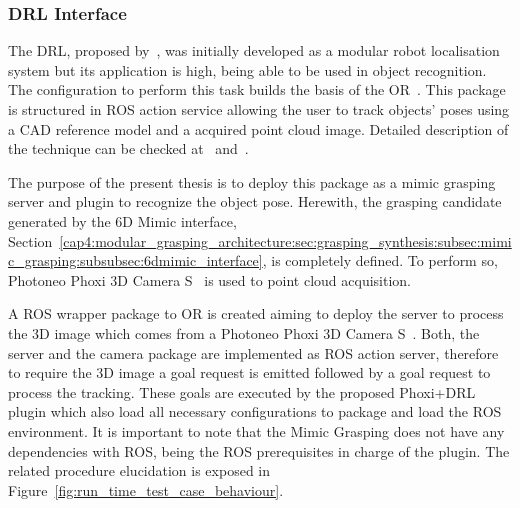 \subsubsection{\acl{DRL} Interface}
\label{cap4:modular_grasping_architecture:sec:grasping_synthesis:subsec:mimic_grasping:subsubsec:drl_interface}

The \ac{DRL}, proposed by~\cite{COSTA2016113}, was initially developed as a modular robot localisation system but its application is high, being able to be used in object recognition. The configuration to perform this task builds the basis of the \ac{OR}~\cite{or}. This package is structured in \ac{ROS} action service allowing the user to track objects' poses using a CAD reference model and a acquired point cloud image. Detailed description of the technique can be checked at~\cite{COSTA2016113} and~\cite{or}.

The purpose of the present thesis is to deploy this package as a mimic grasping server and plugin to recognize the object pose. Herewith, the grasping candidate generated by the 6D Mimic interface, Section~\ref{cap4:modular_grasping_architecture:sec:grasping_synthesis:subsec:mimic_grasping:subsubsec:6dmimic_interface}, is completely defined. To perform so, Photoneo Phoxi 3D Camera S~\cite{photoneo} is used to point cloud acquisition.


A \ac{ROS} wrapper package to \ac{OR} is created aiming to deploy the server to process the 3D image which comes from a Photoneo Phoxi 3D Camera S~\cite{photoneo}. Both, the server and the camera package are implemented as \ac{ROS} action server, therefore to require the 3D image a goal request is emitted followed by a goal request to process the tracking. These goals are executed by the proposed Phoxi+\ac{DRL} plugin which also load all necessary configurations to package and load the \ac{ROS} environment. It is important to note that the Mimic Grasping does not have any dependencies with ROS, being the \ac{ROS} prerequisites in charge of the plugin. The related procedure elucidation is exposed in Figure~\ref{fig:run_time_test_case_behaviour}.


